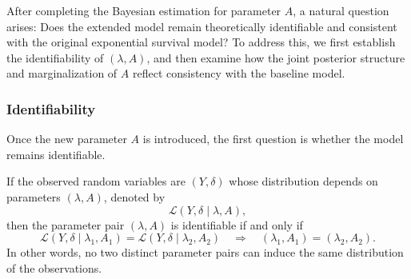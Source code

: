 After completing the Bayesian estimation for parameter $A$, a natural question arises: 
Does the extended model remain theoretically identifiable and consistent with the original exponential survival model? 
To address this, we first establish the identifiability of $(\lambda, A)$, and then examine how the joint posterior structure and marginalization of $A$ reflect consistency with the baseline model. 

\subsubsection{Identifiability}
Once the new parameter $A$ is introduced, the first question is whether the model remains identifiable. 
\begin{definition}
If the observed random variables are $(Y, \delta)$ whose distribution depends on parameters $(\lambda, A)$, denoted by
\begin{equation}
    \mathcal{L}(Y,\delta \mid \lambda,A),
\end{equation}
then the parameter pair $(\lambda, A)$ is identifiable if and only if
\begin{equation}
    \mathcal{L}(Y,\delta \mid \lambda_1,A_1) = \mathcal{L}(Y,\delta \mid \lambda_2,A_2)
\quad \Rightarrow \quad (\lambda_1,A_1) = (\lambda_2,A_2).
\end{equation}
In other words, no two distinct parameter pairs can induce the same distribution of the observations.
\end{definition}
